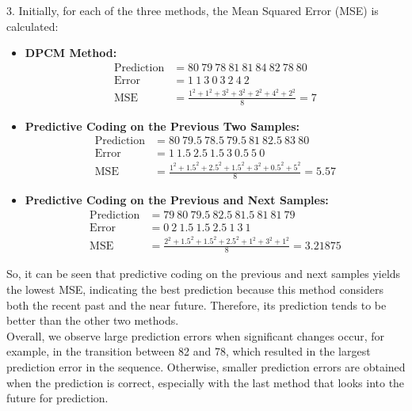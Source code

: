 \documentclass[letterpaper, 12pt]{article}
\begin{document}
3. Initially, for each of the three methods, the Mean Squared Error (MSE) is calculated:
   \begin{itemize}
       \item \textbf{DPCM Method:}
       \begin{align*}
           \text{Prediction} &= 80\ 79\ 78\ 81\ 81\ 84\ 82\ 78\ 80 \\
           \text{Error} &= 1\ 1\ 3\ 0\ 3\ 2\ 4\ 2 \\
           \text{MSE} &= \frac{1^2 + 1^2 + 3^2 + 3^2 + 2^2 + 4^2 + 2^2}{8} = 7
       \end{align*}
       
       \item \textbf{Predictive Coding on the Previous Two Samples:}
       \begin{align*}
           \text{Prediction} &= 80\ 79.5\ 78.5\ 79.5\ 81\ 82.5\ 83\ 80 \\
           \text{Error} &= 1\ 1.5\ 2.5\ 1.5\ 3\ 0.5\ 5\ 0 \\
           \text{MSE} &= \frac{1^2 + 1.5^2 + 2.5^2 + 1.5^2 + 3^2 + 0.5^2 + 5^2}{8} = 5.57
       \end{align*}
       
       \item \textbf{Predictive Coding on the Previous and Next Samples:}
       \begin{align*}
           \text{Prediction} &= 79\ 80\ 79.5\ 82.5\ 81.5\ 81\ 81\ 79 \\
           \text{Error} &= 0\ 2\ 1.5\ 1.5\ 2.5\ 1\ 3\ 1 \\
           \text{MSE} &= \frac{2^2 + 1.5^2 + 1.5^2 + 2.5^2 + 1^2 + 3^2 + 1^2}{8} = 3.21875
       \end{align*}
   \end{itemize}

   So, it can be seen that predictive coding on the previous and next samples yields the lowest MSE, indicating the best prediction because this method considers both the recent past and the near future. Therefore, its prediction tends to be better than the other two methods. \\
   Overall, we observe large prediction errors when significant changes occur, for example, in the transition between 82 and 78, which resulted in the largest prediction error in the sequence. Otherwise, smaller prediction errors are obtained when the prediction is correct, especially with the last method that looks into the future for prediction.
\end{document}
